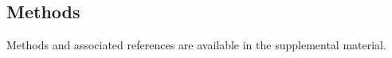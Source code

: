 \subsection*{Methods}

Methods and associated references are available in the supplemental material.
